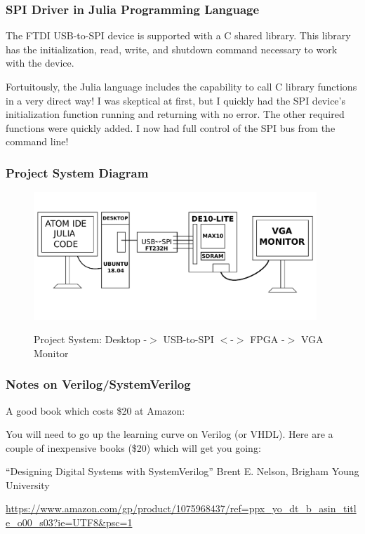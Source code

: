 \documentclass{beamer}
\begin{document}
\begin{frame}
\frametitle{SPI Driver in Julia Programming Language}

The FTDI USB-to-SPI device is supported with a C shared library.  This library has the initialization, read, write, and shutdown
command necessary to work with the device.

Fortuitously, the Julia language includes the capability to call C library functions in a very direct way!
I was skeptical at first, but I quickly had the SPI device's initialization function running and returning with no error.
The other required functions were quickly added.  I now had full control of the SPI bus from the command line!

\end{frame}

\begin{frame}
\frametitle{Project System Diagram}

\begin{figure}[h]
	\centering
	\includegraphics[width=0.95\textwidth]{graphics/project_system}
	\centering\bfseries
	\caption{Project System: Desktop -$>$ USB-to-SPI $<$-$>$ FPGA -$>$ VGA Monitor}
\end{figure}

\end{frame}

\begin{frame}
\frametitle{Notes on Verilog/SystemVerilog}

A good book which costs \$20 at Amazon:

You will need to go up the learning curve on Verilog (or VHDL).
Here are a couple of inexpensive books (\$20) which will get you going:

``Designing Digital Systems with SystemVerilog''
Brent E. Nelson, Brigham Young University

\begin{tiny}
	\url{https://www.amazon.com/gp/product/1075968437/ref=ppx_yo_dt_b_asin_title_o00_s03?ie=UTF8&psc=1}
\end{tiny}

\end{frame}
\end{document}
